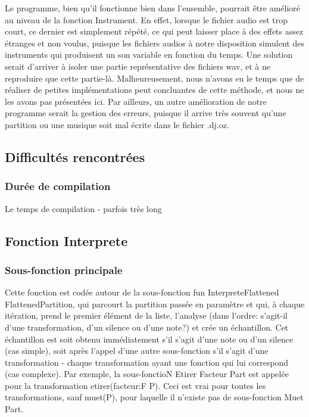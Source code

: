 \documentclass[10pt,a4paper]{article}
\begin{document}
Le programme, bien qu'il fonctionne bien dans l'ensemble, pourrait être amélioré au niveau de la fonction Instrument. En effet, lorsque le fichier audio est trop court, ce dernier est simplement répété, ce qui peut laisser place à des effets assez étranges et non voulus, puisque les fichiers audios à notre disposition simulent des instruments qui produisent un son variable en fonction du temps. Une solution serait d'arriver à isoler une partie représentative des fichiers wav, et à ne reproduire que cette partie-là. Malheureusement, nous n'avons eu le temps que de réaliser de petites implémentations peut concluantes de cette méthode, et nous ne les avons pas présentées ici.
Par ailleurs, un autre amélioration de notre programme serait la gestion des erreurs, puisque il arrive très souvent qu'une partition ou une musique soit mal écrite dans le fichier .dj.oz.

\subsection{Difficultés rencontrées}
\subsubsection{Durée de compilation}
Le temps de compilation - parfois très long 

\newpage


\subsection{Fonction Interprete}
\subsubsection{Sous-fonction principale}
Cette fonction est codée autour de la sous-fonction fun {InterpreteFlattened FlattenedPartition},
 qui parcourt la partition passée en paramètre et qui, à chaque itération, prend le premier
élément de la liste, l'analyse (dans l'ordre: s'agit-il d'une transformation, d'un silence ou d'une note?)
 et crée un échantillon. Cet échantillon est soit obtenu immédiatement s'il s'agit d'une note ou d'un
silence (cas simple), soit après l'appel d'une autre sous-fonction s'il s'agit d'une transformation -
chaque transformation ayant une fonction qui lui correspond (cas complexe). Par exemple, la sous-fonctioN
{Etirer Facteur Part} est appelée pour la transformation etirer(facteur:F P). Ceci est vrai pour toutes
les transformations, sauf muet(P), pour laquelle il n'existe pas de sous-fonction {Muet Part}.
\end{document}
